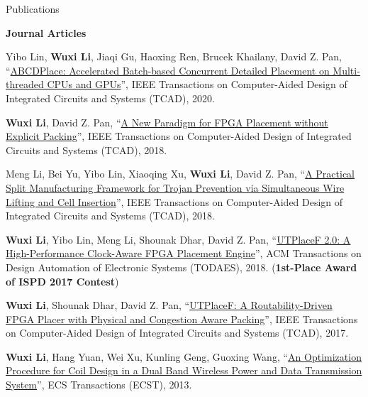 \begin{rSection}{Publications}

\textbf{Journal Articles}
\begin{description}[font=\normalfont]
\item[{[J6]}]{
    Yibo Lin, \textbf{Wuxi Li}, Jiaqi Gu, Haoxing Ren, Brucek Khailany, David Z. Pan,
    ``\href{https://ieeexplore.ieee.org/document/8982049}{ABCDPlace: Accelerated Batch-based Concurrent Detailed Placement on Multi-threaded CPUs and GPUs}'',
    IEEE Transactions on Computer-Aided Design of Integrated Circuits and Systems (TCAD), 2020.
}

\item[{[J5]}]{
    \textbf{Wuxi Li}, David Z. Pan,
    ``\href{https://ieeexplore.ieee.org/document/8500228/}{A New Paradigm for FPGA Placement without Explicit Packing}'',
    IEEE Transactions on Computer-Aided Design of Integrated Circuits and Systems (TCAD), 2018.
}

\item[{[J4]}]{
    Meng Li, Bei Yu, Yibo Lin, Xiaoqing Xu, \textbf{Wuxi Li}, David Z. Pan,
    ``\href{https://ieeexplore.ieee.org/document/8419279/}{A Practical Split Manufacturing Framework for Trojan Prevention via Simultaneous Wire Lifting and Cell Insertion}'',
    IEEE Transactions on Computer-Aided Design of Integrated Circuits and Systems (TCAD), 2018.
}

\item[{[J3]}]{
    \textbf{Wuxi Li}, Yibo Lin, Meng Li, Shounak Dhar, David Z. Pan,
    ``\href{https://dl.acm.org/citation.cfm?id=3174849}{UTPlaceF 2.0: A High-Performance Clock-Aware FPGA Placement Engine}'',
    ACM Transactions on Design Automation of Electronic Systems (TODAES), 2018.
    (\textbf{1st-Place Award of ISPD 2017 Contest})
}

\item[{[J2]}]{
    \textbf{Wuxi Li}, Shounak Dhar, David Z. Pan,
    ``\href{http://ieeexplore.ieee.org/document/7984833/}{UTPlaceF: A Routability-Driven FPGA Placer with Physical and Congestion Aware Packing}'',
    IEEE Transactions on Computer-Aided Design of Integrated Circuits and Systems (TCAD), 2017.
}

\item[{[J1]}]{
    \textbf{Wuxi Li}, Hang Yuan, Wei Xu, Kunling Geng, Guoxing Wang,
    ``\href{http://ecst.ecsdl.org/content/52/1/1091.short}{An Optimization Procedure for Coil Design in a Dual Band Wireless Power and Data Transmission System}'',
    ECS Transactions (ECST), 2013.
}


\end{description}
\end{rSection}
